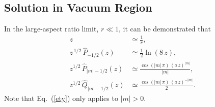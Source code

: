 \documentclass[12pt,prb,aps,notitlepage]{revtex4-1}
\begin{document}
\subsection{Solution in Vacuum Region}
In the large-aspect ratio limit, $r\ll 1$, it can be demonstrated that
\begin{align}
z&\simeq \frac{1}{r},\label{e25t}\\[0.5ex]
z^{\,1/2}\,\hat{P}_{-1/2}(z) &\simeq \frac{1}{2}\ln(8\,z),\\[0.5ex]
z^{1/2}\,\hat{P}_{|m|-1/2}(z) &\simeq \frac{\cos(|m|\,\pi)\,(a\,z)^{|m|}}{|m|},\label{ety}\\[0.5ex]
z^{1/2}\,\hat{Q}_{|m|-1/2}(z) &\simeq \frac{\cos(|m|\,\pi)\,(a\,z)^{-|m|}}{2}.\label{e29t}
\end{align}
Note that Eq.~(\ref{ety}) only applies to $|m|>0$.
\end{document}
